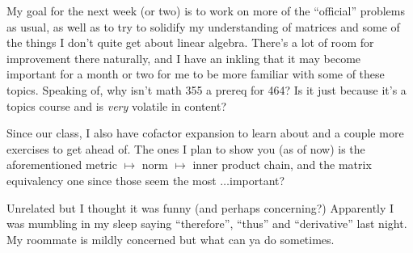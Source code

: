 \documentclass{article}
\begin{document}
My goal for the next week (or two) is to work on more of the ``official'' problems as usual,
as well as to try to solidify my understanding of matrices and some of the things I don't quite get about linear algebra.
There's a lot of room for improvement there naturally, and I have an inkling that it may become important for a month or two for me to be more familiar with some of these topics.
Speaking of, why isn't math 355 a prereq for 464?
Is it just because it's a topics course and is \emph{very} volatile in content?

Since our class, I also have cofactor expansion to learn about and a couple more exercises to get ahead of.
The ones I plan to show you (as of now) is the aforementioned metric $\mapsto$ norm $\mapsto$ inner product chain, and
the matrix equivalency one since those seem the most $\ldots$important?

\vspace{2cm}
Unrelated but I thought it was funny (and perhaps concerning?) Apparently I was mumbling in my sleep saying ``therefore'', ``thus'' and ``derivative'' last night. My roommate is mildly concerned but what can ya do sometimes.
\end{document}
